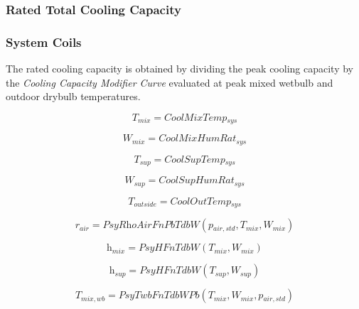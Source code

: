 \subsubsection{Rated Total Cooling Capacity}\label{rated-total-cooling-capacity-2}

\subsubsection{System Coils}\label{system-coils-5}

The rated cooling capacity is obtained by dividing the peak cooling capacity by the \emph{Cooling Capacity Modifier Curve} evaluated at peak mixed wetbulb and outdoor drybulb temperatures.

\begin{equation}
\textit{T\(_{mix}\)} = \textit{CoolMixTemp\(_{sys}\)}
\end{equation}

\begin{equation}
\textit{W\(_{mix}\)} = \textit{CoolMixHumRat\(_{sys}\)}
\end{equation}

\begin{equation}
\textit{T\(_{sup}\)} = \textit{CoolSupTemp\(_{sys}\)}
\end{equation}

\begin{equation}
\textit{W\(_{sup}\)} = \textit{CoolSupHumRat\(_{sys}\)}
\end{equation}

\begin{equation}
\textit{T\(_{outside}\)} = \textit{CoolOutTemp\(_{sys}\)}
\end{equation}

\begin{equation}
\textit{r\(_{air}\)} = \textit{PsyRhoAirFnPbTdbW}(\textit{p\(_{air,std}\)}, \textit{T\(_{mix}\)},\textit{W\(_{mix}\)})
\end{equation}

\begin{equation}
\textit{h\(_{mix}\)} = \textit{PsyHFnTdbW}(\textit{T\(_{mix}\)},\textit{W\(_{mix}\)})
\end{equation}

\begin{equation}
\textit{h\(_{sup}\)} = \textit{PsyHFnTdbW}(\textit{T\(_{sup}\)},\textit{W\(_{sup}\)})
\end{equation}

\begin{equation}
\textit{T\(_{mix,wb}\)} = \textit{PsyTwbFnTdbWPb}(\textit{T\(_{mix}\)},\textit{W\(_{mix}\)}, \textit{p\(_{air,std}\)})
\end{equation}

